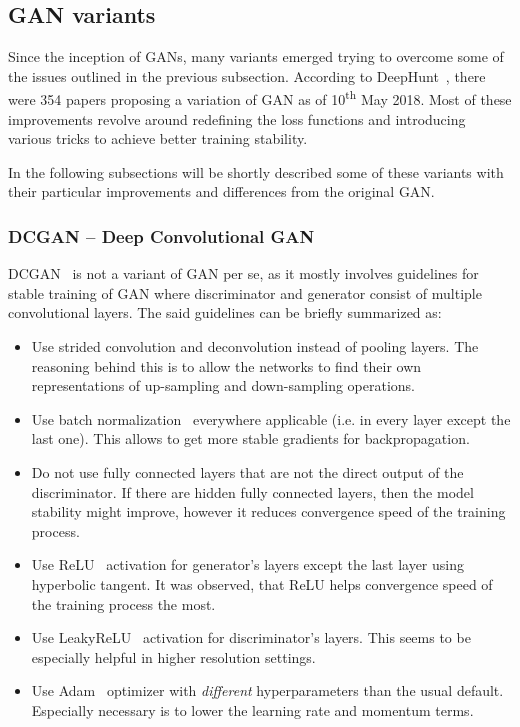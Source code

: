 \subsection{GAN variants}

Since the inception of GANs, many variants emerged trying to overcome some of the issues outlined in the previous subsection. According to DeepHunt~\cite{deephunt}, there were 354 papers proposing a variation of GAN as of 10\textsuperscript{th} May 2018. Most of these improvements revolve around redefining the loss functions and introducing various tricks to achieve better training stability.

In the following subsections will be shortly described some of these variants with their particular improvements and differences from the original GAN.

\subsubsection{DCGAN -- Deep Convolutional GAN}
DCGAN~\cite{dcgan} is not a variant of GAN per se, as it mostly involves guidelines for stable training of GAN where discriminator and generator consist of multiple convolutional layers. The said guidelines can be briefly summarized as:
\begin{itemize}
\item Use strided convolution and deconvolution instead of pooling layers. The reasoning behind this is to allow the networks to find their own representations of up-sampling and down-sampling operations.
\item Use batch normalization~\cite{batchnorm} everywhere applicable (i.e. in every layer except the last one). This allows to get more stable gradients for backpropagation.
\item Do not use fully connected layers that are not the direct output of the discriminator. If there are hidden fully connected layers, then the model stability might improve, however it reduces convergence speed of the training process.
\item Use ReLU~\cite{relu} activation for generator's layers except the last layer using hyperbolic tangent. It was observed, that ReLU helps convergence speed of the training process the most.
\item Use LeakyReLU~\cite{leakyrelu} activation for discriminator's layers. This seems to be especially helpful in higher resolution settings.
\item Use Adam~\cite{adam} optimizer with {\em different} hyperparameters than the usual default. Especially necessary is to lower the learning rate and momentum terms.
\end{itemize}

